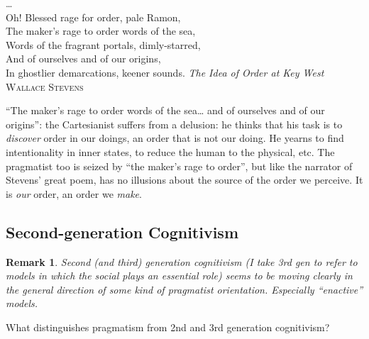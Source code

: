 \documentclass[11pt,twoside]{article}
\newtheorem{remark}{Remark}
\begin{document}
{%
\ldots \\
Oh!  Blessed rage for order, pale Ramon,\\
The maker's rage to order words of the sea,\\
Words of the fragrant portals, dimly-starred,\\
And of ourselves and of our origins,\\
In ghostlier demarcations, keener sounds.
}
{\textit{The Idea of Order at Key West} \\
\textsc{Wallace Stevens}}

``The maker's rage to order words of the sea\ldots{} and of ourselves
and of our origins'': the Cartesianist suffers from a delusion: he
thinks that his task is to \textit{discover} order in our doings, an
order that is not our doing.  He yearns to find intentionality in
inner states, to reduce the human to the physical, etc.  The
pragmatist too is seized by ``the maker's rage to order'', but like
the narrator of Stevens' great poem, has no illusions about the source
of the order we perceive.  It is \textit{our} order, an order we
\textit{make}.

\subsection{Second-generation Cognitivism}

\begin{remark}
  Second (and third) generation cognitivism (I take 3rd gen to refer
  to models in which the social plays an essential role) seems to be
  moving clearly in the general direction of some kind of pragmatist
  orientation.  Especially ``enactive'' models.
\end{remark}

What distinguishes pragmatism from 2nd and 3rd generation cognitivism?
\end{document}
